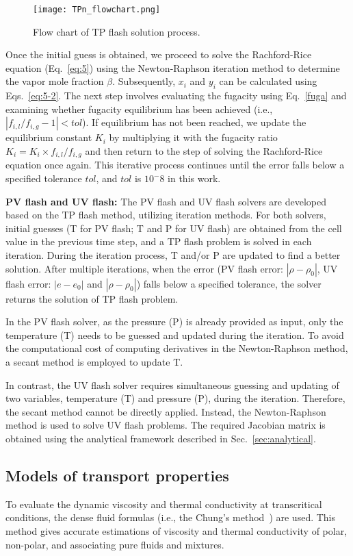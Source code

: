 \begin{figure}[htbp]
\centering
\texttt{[image: TPn\_flowchart.png]}
\caption{Flow chart of TP flash solution process.}
\label{FC} 
\end{figure}

Once the initial guess is obtained, we proceed to solve the Rachford-Rice equation (Eq.~\ref{eq:5}) using the Newton-Raphson iteration method to determine the vapor mole fraction $\beta$. Subsequently, $x_i$ and $y_i$ can be calculated using Eqs.~\ref{eq:5-2}. The next step involves evaluating the fugacity using Eq.~\ref{fuga} and examining whether fugacity equilibrium has been achieved (i.e., $\left|f_{i,l}/f_{i,g}-1\right| < tol $). If equilibrium has not been reached, we update the equilibrium constant $K_i$ by multiplying it with the fugacity ratio $K_i=K_i \times f_{i,l}/f_{i,g}$ and then return to the step of solving the Rachford-Rice equation once again. This iterative process continues until the error falls below a specified tolerance $tol$, and $tol$ is $10^-8$ in this work. 


\textbf{PV flash and UV flash:}
The PV flash and UV flash solvers are developed based on the TP flash method, utilizing iteration methods. For both solvers, initial guesses (T for PV flash; T and P for UV flash) are obtained from the cell value in the previous time step, and a TP flash problem is solved in each iteration. During the iteration process, T and/or P are updated to find a better solution. After multiple iterations, when the error (PV flash error: $|\rho - \rho_0|$, UV flash error: $|e - e_0|$ and $|\rho - \rho_0|$) falls below a specified tolerance, the solver returns the solution of TP flash problem.


In the PV flash solver, as the pressure (P) is already provided as input, only the temperature (T) needs to be guessed and updated during the iteration. To avoid the computational cost of computing derivatives in the Newton-Raphson method, a secant method is employed to update T.


In contrast, the UV flash solver requires simultaneous guessing and updating of two variables,  temperature (T) and pressure (P), during the iteration. Therefore, the secant method cannot be directly applied. Instead, the Newton-Raphson method is used to solve UV flash problems. The required Jacobian matrix is obtained using the analytical framework described in Sec.~\ref{sec:analytical}.



\subsection{Models of transport properties}
To evaluate the dynamic viscosity and thermal conductivity at transcritical conditions, the dense fluid formulas (i.e., the Chung's method~\cite{chung1988generalized}) are used. This method gives accurate estimations of viscosity and thermal conductivity of polar, non-polar, and associating pure fluids and mixtures. 
